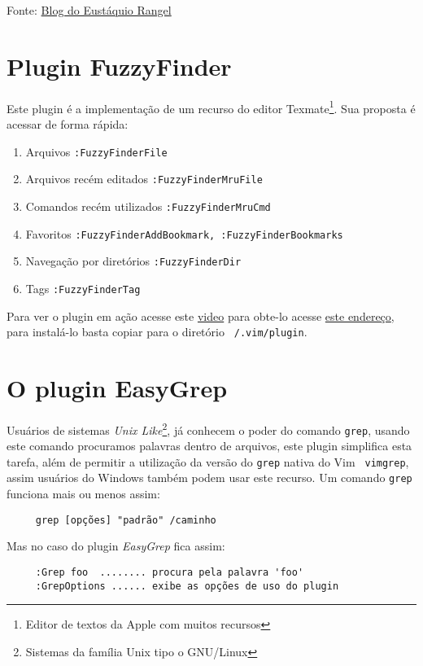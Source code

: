 Fonte: \href{http://eustaquiorangel.com/posts/522}{Blog do Eustáquio
Rangel}~\cite{SiteEustaquioRangel03}

\section{Plugin FuzzyFinder}\label{sec:Plugin FuzzyFinder}                                       
Este plugin é a implementação de um recurso do editor 
Texmate\footnote{Editor de textos da Apple com muitos recursos}.
Sua proposta é acessar de forma rápida:

\begin{enumerate}
\item Arquivos \verb|:FuzzyFinderFile|
\item Arquivos recém editados \verb|:FuzzyFinderMruFile|
\item Comandos recém utilizados \verb|:FuzzyFinderMruCmd|
\item Favoritos \verb|:FuzzyFinderAddBookmark, :FuzzyFinderBookmarks|
\item Navegação por diretórios \verb|:FuzzyFinderDir|
\item Tags {\tt :FuzzyFinderTag}
\end{enumerate}

Para ver o plugin em ação acesse este
\href{http://vimeo.com/2938498}{video} para obte-lo acesse 
 \href{http://www.vim.org/scripts/script.php?script\_id=1984}{este endereço},
para instalá-lo basta copiar para o diretório 
{\tt ~/.vim/plugin}.

\section{O plugin EasyGrep}
\label{sec:O plugin EasyGrep}

Usuários de sistemas {\em Unix Like}\footnote{Sistemas da família Unix tipo o
GNU/Linux}, já conhecem o poder do comando {\tt grep}, usando este comando
procuramos palavras dentro de arquivos, este plugin simplifica esta tarefa,
além de permitir a utilização da versão do {\tt grep} nativa do Vim {\tt
vimgrep}, assim usuários do Windows também podem usar este recurso. Um comando
{\tt grep} funciona mais ou menos assim:

\begin{verbatim}
     grep [opções] "padrão" /caminho
\end{verbatim}

Mas no caso do plugin {\em EasyGrep} fica assim:

\begin{verbatim}
     :Grep foo  ........ procura pela palavra 'foo'
     :GrepOptions ...... exibe as opções de uso do plugin
\end{verbatim}

